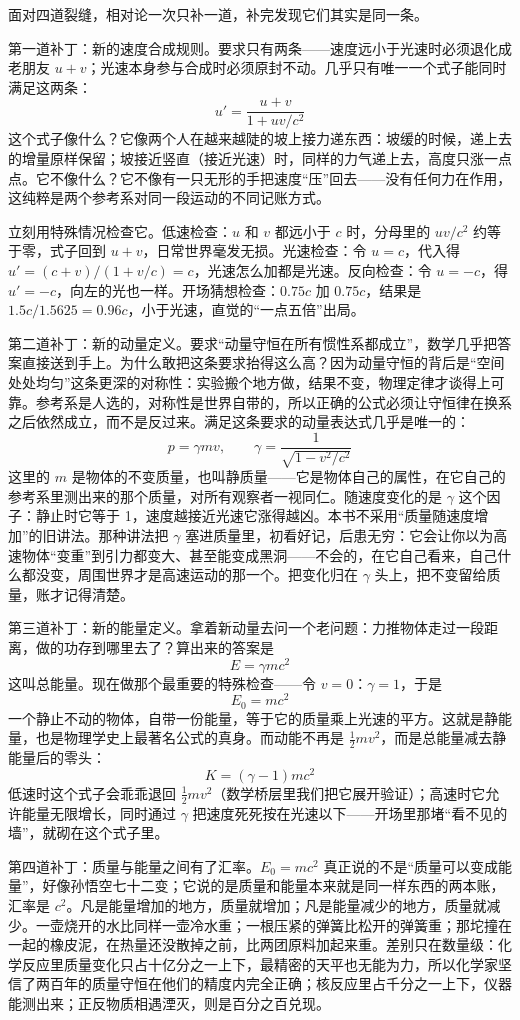 \begin{mainline}
面对四道裂缝，相对论一次只补一道，补完发现它们其实是同一条。

第一道补丁：新的速度合成规则。要求只有两条——速度远小于光速时必须退化成老朋友 \(u+v\)；光速本身参与合成时必须原封不动。几乎只有唯一一个式子能同时满足这两条：
\[
u'=\frac{u+v}{1+uv/c^{2}}
\]
这个式子像什么？它像两个人在越来越陡的坡上接力递东西：坡缓的时候，递上去的增量原样保留；坡接近竖直（接近光速）时，同样的力气递上去，高度只涨一点点。它不像什么？它不像有一只无形的手把速度“压”回去——没有任何力在作用，这纯粹是两个参考系对同一段运动的不同记账方式。

立刻用特殊情况检查它。低速检查：\(u\) 和 \(v\) 都远小于 \(c\) 时，分母里的 \(uv/c^{2}\) 约等于零，式子回到 \(u+v\)，日常世界毫发无损。光速检查：令 \(u=c\)，代入得 \(u'=(c+v)/(1+v/c)=c\)，光速怎么加都是光速。反向检查：令 \(u=-c\)，得 \(u'=-c\)，向左的光也一样。开场猜想检查：\(0.75c\) 加 \(0.75c\)，结果是 \(1.5c/1.5625=0.96c\)，小于光速，直觉的“一点五倍”出局。

第二道补丁：新的动量定义。要求“动量守恒在所有惯性系都成立”，数学几乎把答案直接送到手上。为什么敢把这条要求抬得这么高？因为动量守恒的背后是“空间处处均匀”这条更深的对称性：实验搬个地方做，结果不变，物理定律才谈得上可靠。参考系是人选的，对称性是世界自带的，所以正确的公式必须让守恒律在换系之后依然成立，而不是反过来。满足这条要求的动量表达式几乎是唯一的：
\[
p=\gamma mv,\qquad \gamma=\frac{1}{\sqrt{1-v^{2}/c^{2}}}
\]
这里的 \(m\) 是物体的不变质量，也叫静质量——它是物体自己的属性，在它自己的参考系里测出来的那个质量，对所有观察者一视同仁。随速度变化的是 \(\gamma\) 这个因子：静止时它等于 1，速度越接近光速它涨得越凶。本书不采用“质量随速度增加”的旧讲法。那种讲法把 \(\gamma\) 塞进质量里，初看好记，后患无穷：它会让你以为高速物体“变重”到引力都变大、甚至能变成黑洞——不会的，在它自己看来，自己什么都没变，周围世界才是高速运动的那一个。把变化归在 \(\gamma\) 头上，把不变留给质量，账才记得清楚。

第三道补丁：新的能量定义。拿着新动量去问一个老问题：力推物体走过一段距离，做的功存到哪里去了？算出来的答案是
\[
E=\gamma mc^{2}
\]
这叫总能量。现在做那个最重要的特殊检查——令 \(v=0\)：\(\gamma=1\)，于是
\[
E_{0}=mc^{2}
\]
一个静止不动的物体，自带一份能量，等于它的质量乘上光速的平方。这就是静能量，也是物理学史上最著名公式的真身。而动能不再是 \(\tfrac12 mv^{2}\)，而是总能量减去静能量后的零头：
\[
K=(\gamma-1)mc^{2}
\]
低速时这个式子会乖乖退回 \(\tfrac12 mv^{2}\)（数学桥层里我们把它展开验证）；高速时它允许能量无限增长，同时通过 \(\gamma\) 把速度死死按在光速以下——开场里那堵“看不见的墙”，就砌在这个式子里。

第四道补丁：质量与能量之间有了汇率。\(E_{0}=mc^{2}\) 真正说的不是“质量可以变成能量”，好像孙悟空七十二变；它说的是质量和能量本来就是同一样东西的两本账，汇率是 \(c^{2}\)。凡是能量增加的地方，质量就增加；凡是能量减少的地方，质量就减少。一壶烧开的水比同样一壶冷水重；一根压紧的弹簧比松开的弹簧重；那坨撞在一起的橡皮泥，在热量还没散掉之前，比两团原料加起来重。差别只在数量级：化学反应里质量变化只占十亿分之一上下，最精密的天平也无能为力，所以化学家坚信了两百年的质量守恒在他们的精度内完全正确；核反应里占千分之一上下，仪器能测出来；正反物质相遇湮灭，则是百分之百兑现。
\end{mainline}

